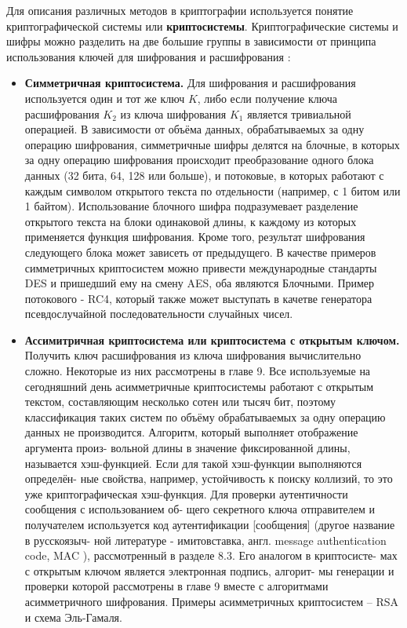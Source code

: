 Для описания различных методов в криптографии используется понятие криптографической системы или
\textbf{криптосистемы}.
Криптографические системы и шифры можно разделить на две большие группы в зависимости от принципа
использования ключей для шифрования и расшифрования \cite{crypto-methods}:
\begin{itemize}
    \item \textbf{Симметричная криптосистема.} Для шифрования и расшифрования используется один и
        тот же ключ $\mathit{K}$, либо если получение ключа расшифрования $\mathit{K_2}$ из ключа
        шифрования $\mathit{K_1}$ является тривиальной операцией. В зависимости от объёма данных,
        обрабатываемых за одну операцию шифрования, симметричные шифры делятся на блочные, в
        которых за одну операцию шифрования происходит преобразование одного блока данных (32 бита,
        64, 128 или больше), и потоковые, в которых работают с каждым символом открытого текста по
        отдельности (например, с 1 битом или 1 байтом). Использование блочного шифра подразумевает
        разделение открытого текста на блоки одинаковой длины, к каждому из которых применяется
        функция шифрования. Кроме того, результат шифрования следующего блока может зависеть от
        предыдущего. В качестве примеров симметричных криптосистем можно привести международные
        стандарты DES и пришедший ему на смену AES, оба являются Блочными. Пример потокового - RC4,
        который также может выступать в качетве генератора псевдослучайной последовательности
        случайных чисел.
    \item \textbf{Ассимитричная криптосистема или криптосистема с открытым ключом.} Получить ключ
        расшифрования из ключа шифрования вычислительно сложно. Некоторые из них рассмотрены в
        главе 9. Все используемые на сегодняшний день асимметричные криптосистемы работают с
        открытым текстом, составляющим несколько сотен или тысяч бит, поэтому классификация таких
        систем по объёму обрабатываемых за одну операцию данных не производится. Алгоритм, который
        выполняет отображение аргумента произ- вольной длины в значение фиксированной длины,
        называется хэш-функцией. Если для такой хэш-функции выполняются определён- ные свойства,
        например, устойчивость к поиску коллизий, то это уже криптографическая хэш-функция.
        Для проверки аутентичности сообщения с использованием об- щего секретного ключа
        отправителем и получателем используется код аутентификации [сообщения] (другое название в
        русскоязыч- ной литературе - имитовставка, англ. message authentication code, MAC ),
        рассмотренный в разделе 8.3. Его аналогом в криптосисте- мах с открытым ключом является
        электронная подпись, алгорит- мы генерации и проверки которой рассмотрены в главе 9 вместе
        с алгоритмами асимметричного шифрования. Примеры асимметричных криптосистем – RSA и схема
        Эль-Гамаля.
\end{itemize}

